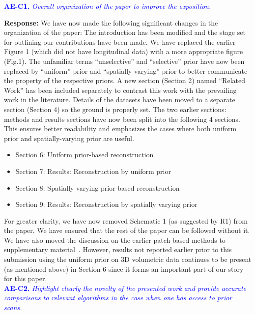 \documentclass{article}
\begin{document}
\textcolor{blue}{\textbf{AE-C1.}\textit{ Overall organization of the paper to improve the exposition.}}

\textbf{Response:} 
We have now made the following significant changes in the organization of the paper:
The introduction has been modified and the stage set for outlining our contributions have been made.  We have replaced the earlier Figure 1 (which did not have longitudinal data) with a more appropriate figure (Fig.1). The unfamiliar terms ``unselective'' and ``selective'' prior have now been replaced by ``uniform'' prior and ``spatially varying'' prior to better communicate the property of the respective priors.
A new section  (Section 2) named ``Related Work'' has been included separately to contrast this work with the prevailing work in the literature. 
Details of the datasets have been moved to a separate section (Section 4) so the ground is properly set.
The two earlier sections: methods and results sections have now been split into the following 4 sections. This ensures better readability and emphasizes the cases where both uniform prior and spatially-varying prior are useful.
\begin{itemize}
 \item Section 6: Uniform prior-based reconstruction
 \item Section 7: Results: Reconstruction by uniform prior
 \item Section 8: Spatially varying prior-based reconstruction
 \item Section 9: Results: Reconstruction by spatially varying prior
   \end{itemize}
For greater clarity, we have now removed Schematic 1 (as suggested by R1) from the paper. We have  ensured that the rest of the paper can be followed without it. We have also moved the discussion on the earlier patch-based methods to supplementary material~\cite{supp_paper}. However, results not reported earlier prior to this submission using the uniform prior on 3D volumetric data continues to be present (as mentioned above) in Section 6 since it forms an important part of our story for this paper.\\

\textcolor{blue}{\textbf{AE-C2.}\textit{ Highlight clearly the novelty of the presented work and provide accurate comparisons to relevant algorithms in the case when one has access to prior scans.}}
\end{document}

